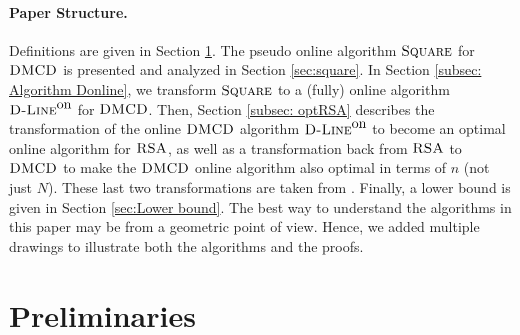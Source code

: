 \documentclass[11pt]{article}
\newcommand{\DMCD}{\mbox{\sc DMCD}}
\newcommand{\RSA}{\mbox{\sc RSA}}
\newcommand{\Square}[0]{\mbox{\sc Square}}
\newcommand{\Dlineon}[0]{\mbox{{\sc D-Line}}^{\mbox{\upshape on}}}
\begin{document}
\paragraph*{Paper Structure.}
Definitions are given in Section \ref{Sec:preliminaries}.
The pseudo online algorithm $\Square$ for $\DMCD$ is presented and analyzed in Section \ref{sec:square}.
In Section \ref{subsec: Algorithm Donline}, we transform $\Square$ to a (fully) online algorithm  $\Dlineon$ for $\DMCD$.
Then, Section \ref{subsec: optRSA} describes the transformation of the online $\DMCD$ algorithm  $\Dlineon$ to become an optimal online algorithm for $\RSA$, as well as a transformation back from $\RSA$ to $\DMCD$ to make the $\DMCD$ online algorithm also optimal in terms of $n$ (not just $N$).
These last two transformations are taken from \cite{KK2014}. Finally, a lower bound is given in Section \ref{sec:Lower bound}.
The best way to understand the algorithms in this paper may be from a geometric point of view.
Hence, we added multiple drawings
to illustrate both the algorithms and the proofs.




\vspace{-0.3cm}
\section{Preliminaries}
\label{Sec:preliminaries}
\label{sec:preliminaries}
\end{document}
